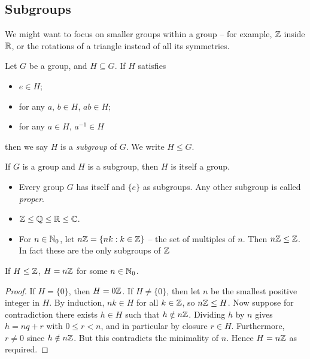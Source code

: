 \documentclass{../template/note}
\begin{document}
    \subsection{Subgroups}

    We might want to focus on smaller groups within a group -- for example, \(\mathbb Z\) inside \(\mathbb R\), or the rotations of a triangle instead of all its symmetries.

    \begin{definition}
        Let \(G\) be a group, and \(H \subseteq G\). If \(H\) satisfies
        \begin{itemize}
            \item \(e \in H\);
            \item for any \(a\), \(b \in H\), \(ab \in H\);
            \item for any \(a \in H\), \(a^{-1} \in H\)
        \end{itemize}
        then we say \(H\) is a \emph{subgroup} of \(G\). We write \(H \leq G\).
        
    \end{definition}
    
    \begin{remark*}
        If \(G\) is a group and \(H\) is a subgroup, then \(H\) is itself a group.
    \end{remark*}
    
    \begin{example*}
        \begin{itemize}
            \item Every group \(G\) has itself and \(\{e\}\) as subgroups. Any other subgroup is called \emph{proper}.
            \item \(\mathbb Z \leq \mathbb Q \leq \mathbb R \leq \mathbb C\).
            \item For \(n \in \mathbb N_0\), let \(n\mathbb Z = \{nk : k \in \mathbb Z\}\) -- the set of multiples of \(n\). Then \(n\mathbb Z \leq \mathbb Z\). In fact these are the only subgroups of \(\mathbb Z\)
            
        \end{itemize}
        
        
    \end{example*}
    
    \begin{proposition}
        If \(H \leq \mathbb Z\), \(H = n\mathbb Z\) for some \(n \in \mathbb N_0\).
    \end{proposition}
    
    \begin{proof}
        If \(H = \{0\}\), then \(H = 0\mathbb Z\). If \(H \neq \{0\}\), then let \(n\) be the smallest positive integer in \(H\). By induction, \(nk \in H\) for all \(k \in \mathbb Z\), so \(n\mathbb Z \leq H\). Now suppose for contradiction there exists \(h \in H\) such that \(h \notin n\mathbb Z\). Dividing \(h\) by \(n\) gives \(h = nq + r\) with \(0 \leq r < n\), and in particular by closure \(r \in H\). Furthermore, \(r \neq 0\) since \(h \notin n\mathbb Z\). But this contradicts the minimality of \(n\). Hence \(H = n\mathbb Z\) as required.
    \end{proof}
    
\end{document}
